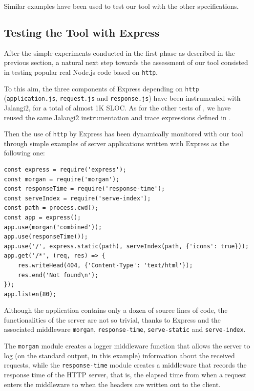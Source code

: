 Similar examples have been used to test our tool with the other specifications.

\subsection{Testing the Tool with Express}\label{sec:express}

After the simple experiments conducted in the first phase as described in the previous section,
a natural next step towards the assessment of our tool consisted in testing popular real Node.js code
based on \lstinline{http}.

To this aim, the three components of Express depending on \lstinline{http} (\lstinline{application.js}, \lstinline{request.js} and
\lstinline{response.js}) have been instrumented with Jalangi2, for a total of almost 1K SLOC.
As for the other tests of , we have reused the same Jalangi2 instrumentation and trace expressions defined in .

Then the use of \lstinline{http} by Express has been dynamically monitored with our tool through simple
examples of server applications written with Express as the following one:
\begin{lstlisting}
const express = require('express');
const morgan = require('morgan');
const responseTime = require('response-time');
const serveIndex = require('serve-index');
const path = process.cwd();
const app = express();
app.use(morgan('combined'));
app.use(responseTime());
app.use('/', express.static(path), serveIndex(path, {'icons': true}));
app.get('/*', (req, res) => {
    res.writeHead(404, {'Content-Type': 'text/html'});
    res.end('Not found\n');
});
app.listen(80);
\end{lstlisting}
Although the application contains only a dozen of source lines of code, the
functionalities of the server are not so trivial, thanks to Express and the
associated middleware \lstinline{morgan}, \lstinline{response-time}, \lstinline{serve-static} and
\lstinline{serve-index}.

The \lstinline{morgan} module creates a logger middleware function that allows the server to log (on the standard output, in this example)
information about the received requests, while the \lstinline{response-time} module
creates a middleware that records the response time of the HTTP server, that is, the elapsed time from when a
request enters the middleware to when the headers are written out to the client.

